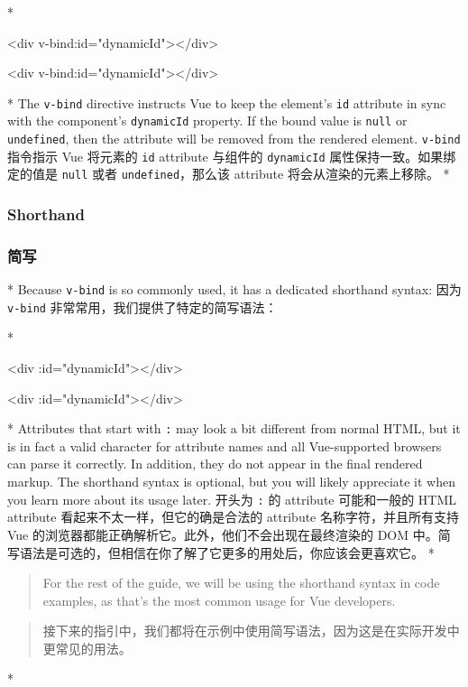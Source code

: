 \begin{paracol}{2}
\switchcolumn[0]*%
\begin{codeHtml}
<div v-bind:id="dynamicId"></div>
\end{codeHtml}  
\switchcolumn
\begin{codeHtml}
<div v-bind:id="dynamicId"></div>
\end{codeHtml}  
\switchcolumn[0]*%
The \texttt{v-bind} directive instructs Vue to keep the element's
\texttt{id} attribute in sync with the component's \texttt{dynamicId}
property. If the bound value is \texttt{null} or \texttt{undefined},
then the attribute will be removed from the rendered element.
\switchcolumn
\texttt{v-bind} 指令指示 Vue 将元素的 \texttt{id} attribute 与组件的
\texttt{dynamicId} 属性保持一致。如果绑定的值是 \texttt{null} 或者
\texttt{undefined}，那么该 attribute 将会从渲染的元素上移除。
\switchcolumn[0]*%
\subsubsection{Shorthand}
\switchcolumn
\subsubsection{简写}
\switchcolumn[0]*%
Because \texttt{v-bind} is so commonly used, it has a dedicated
shorthand syntax:
\switchcolumn
因为 \texttt{v-bind} 非常常用，我们提供了特定的简写语法：


\switchcolumn[0]*%
\begin{codeHtml}
<div :id="dynamicId"></div>
\end{codeHtml}  
\switchcolumn
\begin{codeHtml}
<div :id="dynamicId"></div>
\end{codeHtml}  
\switchcolumn[0]*%
Attributes that start with \texttt{:} may look a bit different from
normal HTML, but it is in fact a valid character for attribute names and
all Vue-supported browsers can parse it correctly. In addition, they do
not appear in the final rendered markup. The shorthand syntax is
optional, but you will likely appreciate it when you learn more about
its usage later.
\switchcolumn
开头为 \texttt{:} 的 attribute 可能和一般的 HTML attribute
看起来不太一样，但它的确是合法的 attribute 名称字符，并且所有支持 Vue
的浏览器都能正确解析它。此外，他们不会出现在最终渲染的 DOM
中。简写语法是可选的，但相信在你了解了它更多的用处后，你应该会更喜欢它。
\switchcolumn[0]*%
\begin{quote}
For the rest of the guide, we will be using the shorthand syntax in code
examples, as that's the most common usage for Vue developers.
\end{quote}
\switchcolumn
\begin{quote}
接下来的指引中，我们都将在示例中使用简写语法，因为这是在实际开发中更常见的用法。
\end{quote}
\switchcolumn[0]*%

\end{paracol}
